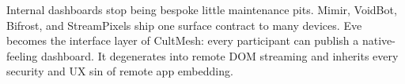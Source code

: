 \ProjectionBand
{Internal dashboards stop being bespoke little maintenance pits.}
{Mimir, VoidBot, Bifrost, and StreamPixels ship one surface contract to many devices.}
{Eve becomes the interface layer of CultMesh: every participant can publish a native-feeling dashboard.}
{It degenerates into remote DOM streaming and inherits every security and UX sin of remote app embedding.}

